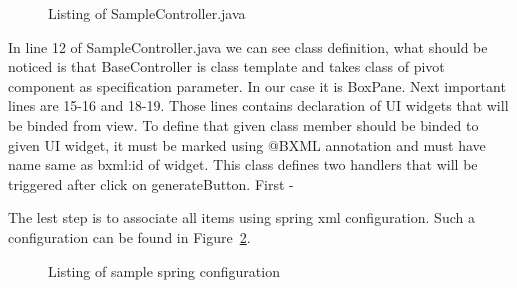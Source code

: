 \pagebreak

\begin{figure}[ht]
  \centering
    
  \caption{Listing of SampleController.java}
  \label{fig:sample_controller}
\end{figure} 

In line 12 of SampleController.java we can see class definition, what should be noticed is that BaseController is
class template and takes class of pivot component as specification parameter. In our case it is BoxPane. Next important
lines are 15-16 and 18-19. Those lines contains declaration of UI widgets that will be binded from view. To define that
given class member should be binded to given UI widget, it must be marked using @BXML annotation and must have name same
as bxml:id of widget. This class defines two handlers that will be triggered after click on generateButton. First - 

\pagebreak
The lest step is to associate all items using spring xml configuration. Such a configuration can be found in
Figure~\ref{fig:sample_spring}.


\begin{figure}[ht]
  \centering
    
  \caption{Listing of sample spring configuration}
  \label{fig:sample_spring}
\end{figure}



 